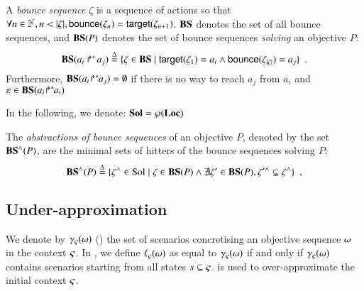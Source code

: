 \begin{definition}
\label{def:bs}
  A \emph{bounce sequence} $\zeta$ is a sequence of actions so that $\forall n \in \mathbb{I}^{\zeta}, n < |\zeta|, \mathsf{bounce}(\zeta_{n}) = \mathsf{target}(\zeta_{n+1})$.
  $\mathbf{BS}$ denotes the set of all bounce sequences, and
  $\mathbf{BS}(P)$ denotes the set of bounce sequences \emph{solving} an objective $P$:
  \[
    \mathbf{BS}(\mbox{$a_i\Rsh^*\!a_j$}) \stackrel{\Delta}= \{ \zeta \in \mathbf{BS} \mid \mathsf{target}(\zeta_1)= a_i \wedge \mathsf{bounce}(\zeta_{|\zeta|}) = a_j \} \enspace.
  \]
  Furthermore, $\mathbf{BS}({a_i\!\Rsh^*\!\!a_j}) = \emptyset$ if there is no way to reach $a_j$ from $a_i$
  and $\varepsilon \in \mathbf{BS}({a_i\!\Rsh^*\!\!a_i})$
\end{definition}

In the following, we denote: $\mathbf{Sol} = \wp(\mathbf{Loc})$
%
%

\begin{definition}[$\aBS:\Obj \rightarrow \powerset(\Sol)$]
\label{def:aBS}
  The \emph{abstractions of bounce sequences} of an objective $P$, denoted by the set $\mathbf{BS}^\wedge(P)$, are the minimal sets of hitters of the bounce sequences solving $P$:
  \[
    \mathbf{BS}^\wedge(P) \stackrel{\Delta}= \{ \zeta^\wedge \in \mathrm{Sol} \mid
      \zeta \in \mathbf{BS}(P) \wedge
      \nexists \zeta' \in \mathbf{BS}(P), \zeta'^\wedge \subsetneq \zeta^\wedge \} \enspace,
  \]
  
  \noindent
\end{definition}



\subsection{Under-approximation}
\label{ssec:ua}

We denote by $\gamma_\varsigma(\omega)$ () the set of scenarios concretising an objective sequence $\omega$ in the context $\varsigma$.
In , we define $\ell_\varsigma(\omega)$ as equal to $\gamma_\varsigma(\omega)$ if and only if $\gamma_\varsigma(\omega)$ contains scenarios starting from all states $s \subseteq \varsigma$.
 is used to over-approximate the initial context $\varsigma$.

